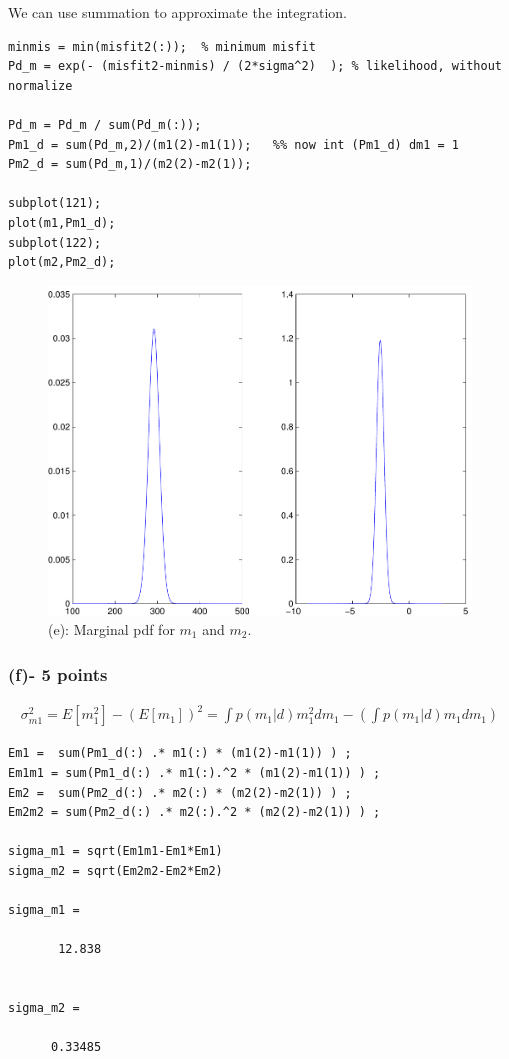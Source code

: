 \documentclass[11pt]{article}
\begin{document}
We can use summation to approximate the integration. 

\begin{verbatim}
minmis = min(misfit2(:));  % minimum misfit
Pd_m = exp(- (misfit2-minmis) / (2*sigma^2)  ); % likelihood, without normalize 

Pd_m = Pd_m / sum(Pd_m(:)); 
Pm1_d = sum(Pd_m,2)/(m1(2)-m1(1));   %% now int (Pm1_d) dm1 = 1
Pm2_d = sum(Pd_m,1)/(m2(2)-m2(1));

subplot(121);
plot(m1,Pm1_d);
subplot(122);
plot(m2,Pm2_d);
\end{verbatim}
\begin{figure}
\begin{center}
  \includegraphics[width=12cm]{p1e.pdf}
  \caption{(e): Marginal pdf for $m_1$ and $m_2$. }
  \end{center}
\end{figure}

\subsubsection*{(f)- 5 points}
\begin{eqnarray*}
\sigma_{m1}^2 = E[m_1^2] - (E[m_1])^2 = \int p(m_1|d) m_1^2 dm_1 - \left(  \int p(m_1|d) m_1 dm_1  \right)
\end{eqnarray*}

\begin{verbatim}
Em1 =  sum(Pm1_d(:) .* m1(:) * (m1(2)-m1(1)) ) ;
Em1m1 = sum(Pm1_d(:) .* m1(:).^2 * (m1(2)-m1(1)) ) ;
Em2 =  sum(Pm2_d(:) .* m2(:) * (m2(2)-m2(1)) ) ;
Em2m2 = sum(Pm2_d(:) .* m2(:).^2 * (m2(2)-m2(1)) ) ;

sigma_m1 = sqrt(Em1m1-Em1*Em1)
sigma_m2 = sqrt(Em2m2-Em2*Em2)

sigma_m1 =

       12.838


sigma_m2 =

      0.33485

\end{verbatim}
\end{document}
